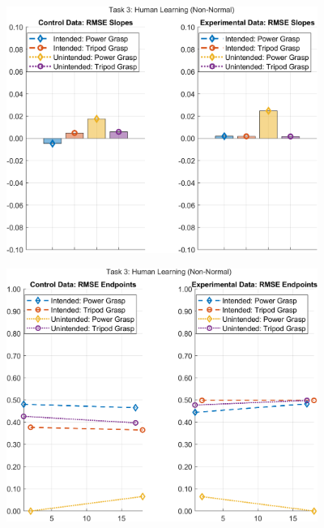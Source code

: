 \documentclass[12pt]{article}
\newcommand\figWidth{4in}
\begin{document}
    \begin{figure}
        \includegraphics[width = \figWidth]{t3-bar-xnorm.png}
    \end{figure}
    \begin{figure}
        \includegraphics[width = \figWidth]{t3-spaghetti-xnorm.png}
    \end{figure}
\end{document}

